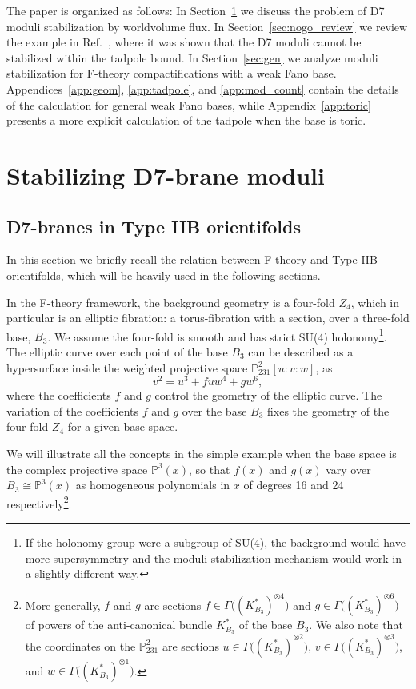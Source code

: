 \documentclass[a4paper,12pt]{article}
\numberwithin{equation}{section}
\newcommand{\mbb}{\mathbb}
\newcommand{\be}{\begin{equation}}
\newcommand{\ee}{\end{equation}}
\newcommand{\fthb}{B_3}				%
\newcommand{\canb}[1]{K_{#1}}			%
\begin{document}
The paper is organized as follows: In Section~\ref{sec:setup} we discuss the problem of D7 moduli stabilization by worldvolume flux. In Section~\ref{sec:nogo_review} we review the example in Ref.~\cite{Collinucci:2008pf}, where it was shown that the D7 moduli cannot be stabilized within the tadpole bound. In Section~\ref{sec:gen} we analyze moduli stabilization for F-theory compactifications with a weak Fano base. Appendices~\ref{app:geom}, \ref{app:tadpole}, and \ref{app:mod_count} contain the details of the calculation for general weak Fano bases, while Appendix~\ref{app:toric} presents a more explicit calculation of the tadpole when the base is toric.

\section{Stabilizing D7-brane moduli}
\label{sec:setup}

\subsection{D7-branes in Type IIB orientifolds}
\label{sec:setup_geom}

In this section we briefly recall the relation between F-theory and Type IIB orientifolds, which will be heavily used in the following sections.

In the F-theory framework, the background geometry is a four-fold $Z_4$, which in particular is an elliptic fibration: a torus-fibration with a section, over a three-fold base, $\fthb$. We assume the four-fold is smooth and has strict SU(4) holonomy\footnote{If the holonomy group were a subgroup of SU(4), the background would have more supersymmetry and the moduli stabilization mechanism would work in a slightly different way.}. The elliptic curve over each point of the base $\fthb$ can be described as a hypersurface inside the weighted projective space $\mbb{P}^2_{231}[u:v:w]$, as
\be
v^2 = u^3 + f u w^4 + g w^6 ,
\ee
where the coefficients $f$ and $g$ control the geometry of the elliptic curve. The variation of the coefficients $f$ and $g$ over the base $\fthb$ fixes the geometry of the four-fold $Z_4$ for a given base space.

We will illustrate all the concepts in the simple example when the base space is the complex projective space $\mbb{P}^3(x)$, so that $f(x)$ and $g(x)$ vary over $\fthb \cong \mbb{P}^3(x)$ as homogeneous polynomials in $x$ of degrees 16 and 24 respectively\footnote{More generally, $f$ and $g$ are sections $f \in \Gamma\big((\canb{\fthb}^*)^{\otimes 4}\big)$ and $g \in \Gamma\big((\canb{\fthb}^*)^{\otimes 6}\big)$ of powers of the anti-canonical bundle $\canb{\fthb}^*$ of the base $\fthb$. We also note that the coordinates on the $\mbb{P}^2_{231}$ are sections $u \in \Gamma\big((\canb{\fthb}^*)^{\otimes 2}\big)$, $v \in \Gamma\big((\canb{\fthb}^*)^{\otimes 3}\big)$, and $w \in \Gamma\big((\canb{\fthb}^*)^{\otimes 1}\big)$.}.
\end{document}
